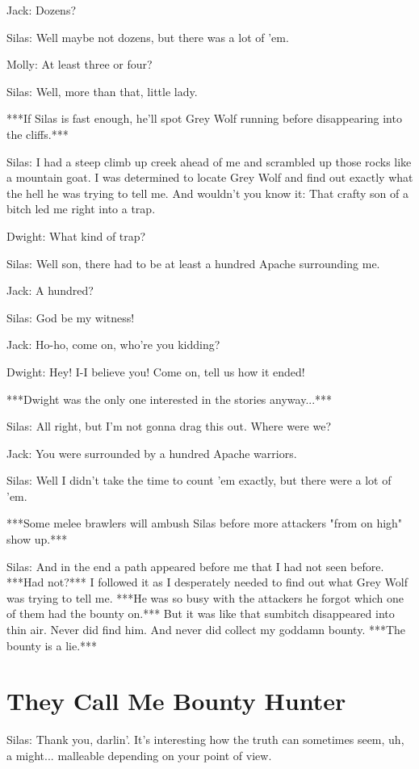 \documentclass{article}
\begin{document}
Jack: Dozens?

Silas: Well maybe not dozens, but there was a lot of 'em.

Molly: At least three or four?

Silas: Well, more than that, little lady.

***If Silas is fast enough, he'll spot Grey Wolf running before disappearing into the cliffs.***

Silas: I had a steep climb up creek ahead of me and scrambled up those rocks like a mountain goat. I was determined to locate Grey Wolf and find out exactly what the hell he was trying to tell me. And wouldn't you know it: That crafty son of a bitch led me right into a trap.

Dwight: What kind of trap?

Silas: Well son, there had to be at least a hundred Apache surrounding me.

Jack: A hundred?

Silas: God be my witness!

Jack: Ho-ho, come on, who're you kidding?

Dwight: Hey! I-I believe you! Come on, tell us how it ended!

***Dwight was the only one interested in the stories anyway...***

Silas: All right, but I'm not gonna drag this out. Where were we?

Jack: You were surrounded by a hundred Apache warriors.

Silas: Well I didn't take the time to count 'em exactly, but there were a lot of 'em.

***Some melee brawlers will ambush Silas before more attackers "from on high" show up.***

Silas: And in the end a path appeared before me that I had not seen before. ***Had not?*** I followed it as I desperately needed to find out what Grey Wolf was trying to tell me. ***He was so busy with the attackers he forgot which one of them had the bounty on.*** But it was like that sumbitch disappeared into thin air. Never did find him. And never did collect my goddamn bounty. ***The bounty is a lie.***

\section*{They Call Me Bounty Hunter}

Silas: Thank you, darlin'. It's interesting how the truth can sometimes seem, uh, a might... malleable depending on your point of view.
\end{document}
